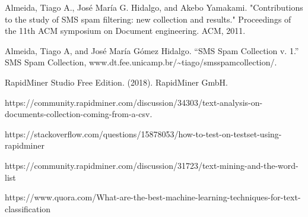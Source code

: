 \documentclass[10pt,journal,compsoc]{IEEEtran}
\begin{document}
\ifCLASSOPTIONcaptionsoff
  \newpage
\fi





%
%
%
\begin{thebibliography}{1}

Almeida, Tiago A., José María G. Hidalgo, and Akebo Yamakami. "Contributions to the study of SMS spam filtering: new collection and results." Proceedings of the 11th ACM symposium on Document engineering. ACM, 2011.

Almeida, Tiago A, and José María Gómez Hidalgo. “SMS Spam Collection v. 1.” SMS Spam Collection, www.dt.fee.unicamp.br/\textasciitilde tiago/smsspamcollection/. 

RapidMiner Studio Free Edition. (2018). RapidMiner GmbH.

https://community.rapidminer.com/discussion/34303/text-analysis-on-documents-collection-coming-from-a-csv.

https://stackoverflow.com/questions/15878053/how-to-test-on-testset-using-rapidminer

https://community.rapidminer.com/discussion/31723/text-mining-and-the-word-list

https://www.quora.com/What-are-the-best-machine-learning-techniques-for-text-classification

\end{thebibliography}


\end{document}
